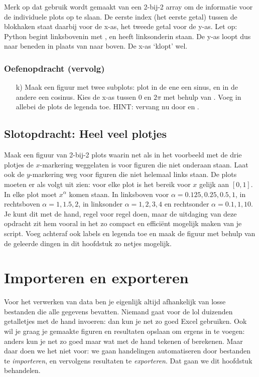 \documentclass[a4paper,11pt, fleqn]{article}
\newcommand{\ditwc}{Naam van het huidige werkcollege}
\begin{document}

Merk op dat gebruik wordt gemaakt van een 2-bij-2 array om de informatie voor de individuele plots op te slaan. De eerste index (het eerste getal) tussen de blokhaken staat daarbij voor de x-as, het tweede getal voor de y-as. Let op: Python begint linksbovenin met \pythoninline{[0,0]}, en heeft \pythoninline{[0,1]} linksonderin staan. De y-as loopt dus naar beneden in plaats van naar boven. De x-as `klopt' wel.

\subsubsection*{Oefenopdracht (vervolg)}
\begin{itemize}
	\item[k)] Maak een figuur met twee subplots: plot in de ene een sinus, en in de andere een cosinus. Kies de x-as tussen 0 en $2\pi$ met behulp van . Voeg in allebei de plots de legenda toe. HINT: vervang  nu door  en .
\end{itemize}

\subsection{Slotopdracht: Heel veel plotjes}
Maak een figuur van 2-bij-2 plots waarin net als in het voorbeeld met de drie plotjes de $x$-markering weggelaten is voor figuren die niet onderaan staan. Laat ook de $y$-markering weg voor figuren die niet helemaal links staan. 
De plots moeten er als volgt uit zien: voor elke plot is het bereik voor $x$ gelijk aan $[0,1]$. In elke plot moet $x^\alpha$ komen staan. In linksboven voor $\alpha = 0.125,0.25,0.5,1$, in rechtsboven $\alpha = 1,1.5,2$, in linksonder $\alpha = 1,2,3,4$ en rechtsonder $\alpha = 0.1,1,10$. Je kunt dit met de hand, regel voor regel doen, maar de uitdaging van deze opdracht zit hem vooral in het zo compact en efficiënt mogelijk maken van je script. Voeg achteraf ook labels en legenda toe en maak de figuur met behulp van de geleerde dingen in dit hoofdstuk zo netjes mogelijk.


\clearpage
\renewcommand{\ditwc}{Importeren en exporteren}
\section[Importeren en exporteren]{\ditwc}
Voor het verwerken van data ben je eigenlijk altijd afhankelijk van losse bestanden die alle gegevens bevatten. Niemand gaat voor de lol duizenden getalletjes met de hand invoeren: dan kun je net zo goed Excel gebruiken. Ook wil je graag je gemaakte figuren en resultaten opslaan om ergens in te voegen: anders kun je net zo goed maar wat met de hand tekenen of berekenen. Maar daar doen we het niet voor: we gaan handelingen automatiseren door bestanden te \textit{importeren}, en vervolgens resultaten te \textit{exporteren}. Dat gaan we dit hoofdstuk behandelen.
\end{document}
